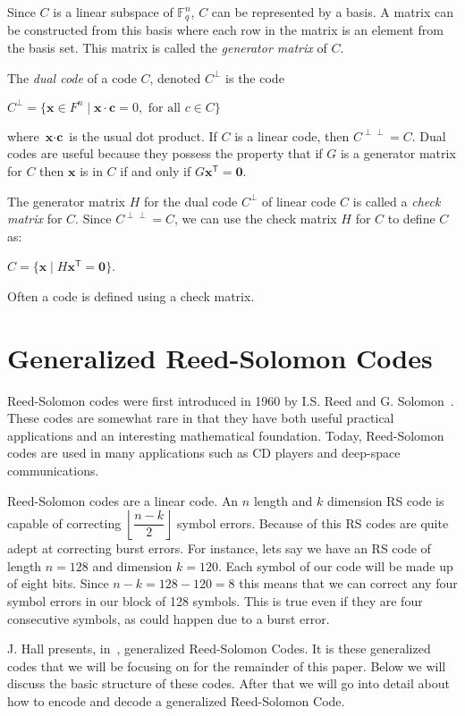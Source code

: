 \documentclass{article}
\begin{document}
Since $C$ is a linear subspace of $\mathbb{F}^{n}_{q}$, $C$ can be represented by a basis. A matrix can be constructed from this basis where each row in the matrix is an element from the basis set. This matrix is called the \textit{generator matrix} of $C$.

The \textit{dual code} of a code $C$, denoted $C^{\perp}$ is the code
\begin{center}
$C^{\perp} = \{\textbf{x} \in F^{n} \mid \textbf{x} \cdot \textbf{c} = 0, \text{ for all } c \in C\}$
\end{center}
where $\textbf{x} \cdot \textbf{c}$ is the usual dot product. If $C$ is a linear code, then $C^{\perp \perp} = C$. Dual codes are useful because they possess the property that if $G$ is a generator matrix for $C$ then $\textbf{x}$ is in $C$ if and only if $G\textbf{x}^{\mathsf{T}} = \textbf{0}$.

The generator matrix $H$ for the dual code $C^{\perp}$ of linear code $C$ is called a \textit{check matrix} for $C$. Since $C^{\perp \perp} = C$, we can use the check matrix $H$ for $C$ to define $C$ as:
\begin{center}
$C = \{\textbf{x} \mid H\textbf{x}^{\mathsf{T}} = \textbf{0}\}$.
\end{center}
Often a code is defined using a check matrix. %

\section{Generalized Reed-Solomon Codes}
Reed-Solomon codes were first introduced in 1960 by I.S. Reed and G. Solomon~\cite{RS:1960}. These codes are somewhat rare in that they have both useful practical applications and an interesting mathematical foundation. Today, Reed-Solomon codes are used in many applications such as CD players and deep-space communications.

Reed-Solomon codes are a linear code. An $n$ length and $k$ dimension RS code is capable of correcting $\left \lfloor{\dfrac{n - k}{2}}\right \rfloor$ symbol errors. Because of this RS codes are quite adept at correcting burst errors. For instance, lets say we have an RS code of length $n = 128$ and dimension $k = 120$. Each symbol of our code will be made up of eight bits. Since $n - k = 128 - 120 = 8$ this means that we can correct any four symbol errors in our block of 128 symbols. This is true even if they are four consecutive symbols, as could happen due to a burst error.

J. Hall presents, in~\cite{Hall:2012}, generalized Reed-Solomon Codes. It is these generalized codes that we will be focusing on for the remainder of this paper. Below we will discuss the basic structure of these codes. After that we will go into detail about how to encode and decode a generalized Reed-Solomon Code.
\end{document}
